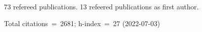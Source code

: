 73 refereed publications. 13 refeered publications as first author.

Total citations~=~2681; h-index~=~27 (2022-07-03)